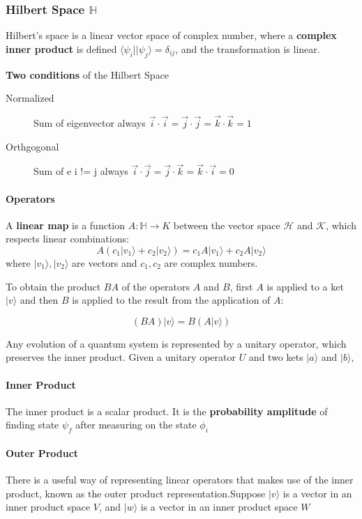 \documentclass[11pt]{article}
\providecommand{\bra}[1]{\langle#1|}
\providecommand{\ket}[1]{|#1\rangle}
\theoremstyle{definition}
\theoremstyle{definition}
\begin{document}
\subsubsection{Hilbert Space \(\mathbb{H}\)}
\label{sec:org36afc5a}
Hilbert's space is a linear vector space of complex number, where a
\textbf{complex inner product} is defined \(\bra{\psi_i}\ket{\psi_j} =
    \delta_{ij}\), and the transformation is linear.


\textbf{Two conditions} of the Hilbert Space
\begin{description}
\item[{Normalized}] Sum of eigenvector always \(\vec{i} \cdot \vec{i} = \vec{j} \cdot \vec{j} = \vec{k} \cdot \vec{k}= 1\)
\item[{Orthgogonal}] Sum of e i != j always \(\vec{i} \cdot \vec{j} = \vec{j} \cdot \vec{k} = \vec{k} \cdot \vec{i}= 0\)
\end{description}



\paragraph{Operators}
\label{sec:org60ff678}
A \textbf{linear map} is a function \(A: \mathbb{H} \rightarrow K\) between the vector space \(\mathcal{H}\) and \(\mathcal{K}\),
which respects linear combinations:
$$A(c_1 \ket{v_1} + c_2\ket{v_2}) = c_1 A \ket{v_1} + c_2 A \ket{v_2}$$
where \(\ket{v_1}, \ket{v_2}\) are vectors and \(c_1, c_2\) are complex numbers.

To obtain the product \(BA\) of the operators \(A\) and \(B\), first \(A\) is applied to
a ket \(\ket{v}\) and then \(B\)  is applied to the result from the application of \(A\):

$$(BA)\ket{v} = B(A\ket{v})$$

Any evolution of a quantum system is represented by a unitary operator, which preserves
the inner product. Given a unitary operator \(U\)  and two kets \(\ket{a}\) and \(\ket{b}\),


\paragraph{Inner Product}
\label{sec:org5cb23fa}
The inner product is a scalar product. It is the \textbf{probability amplitude} of finding state \(\psi_f\) after measuring on the state \(\phi_i\)

\paragraph{Outer Product}
\label{sec:org6103e5c}
There is a useful way of representing linear operators that makes use of
the inner product, known as the outer product representation.Suppose
\(\ket{v}\) is a vector in an inner product space \(V\), and \(\ket{w}\) is a
vector in an inner product space \(W\)
\end{document}
